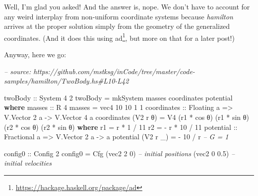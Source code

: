 \documentclass[]{article}
\newenvironment{Shaded}{}{}
\newcommand{\CommentTok}[1]{\textcolor[rgb]{0.38,0.63,0.69}{\textit{#1}}}
\newcommand{\DataTypeTok}[1]{\textcolor[rgb]{0.56,0.13,0.00}{#1}}
\newcommand{\DecValTok}[1]{\textcolor[rgb]{0.25,0.63,0.44}{#1}}
\newcommand{\FloatTok}[1]{\textcolor[rgb]{0.25,0.63,0.44}{#1}}
\newcommand{\FunctionTok}[1]{\textcolor[rgb]{0.02,0.16,0.49}{#1}}
\newcommand{\KeywordTok}[1]{\textcolor[rgb]{0.00,0.44,0.13}{\textbf{#1}}}
\newcommand{\NormalTok}[1]{#1}
\newcommand{\OtherTok}[1]{\textcolor[rgb]{0.00,0.44,0.13}{#1}}
\renewcommand{\href}[2]{#2\footnote{\url{#1}}}
\begin{document}
Well, I'm glad you asked! And the answer is, nope. We don't have to account for
any weird interplay from non-uniform coordinate systems because \emph{hamilton}
arrives at the proper solution simply from the geometry of the generalized
coordinates. (And it does this using
\href{https://hackage.haskell.org/package/ad}{ad}, but more on that for a later
post!)

Anyway, here we go:

\begin{Shaded}
\begin{Highlighting}[]
\CommentTok{-- source: https://github.com/mstksg/inCode/tree/master/code-samples/hamilton/TwoBody.hs#L10-L42}

\OtherTok{twoBody ::} \DataTypeTok{System} \DecValTok{4} \DecValTok{2}
\NormalTok{twoBody }\FunctionTok{=}\NormalTok{ mkSystem masses coordinates potential}
  \KeywordTok{where}
\OtherTok{    masses ::} \DataTypeTok{R} \DecValTok{4}
\NormalTok{    masses }\FunctionTok{=}\NormalTok{ vec4 }\DecValTok{10} \DecValTok{10} \DecValTok{1} \DecValTok{1}
\NormalTok{    coordinates}
\OtherTok{        ::} \DataTypeTok{Floating}\NormalTok{ a}
        \OtherTok{=>} \DataTypeTok{V.Vector} \DecValTok{2}\NormalTok{ a}
        \OtherTok{->} \DataTypeTok{V.Vector} \DecValTok{4}\NormalTok{ a}
\NormalTok{    coordinates (}\DataTypeTok{V2}\NormalTok{ r θ) }\FunctionTok{=} \DataTypeTok{V4}\NormalTok{ (r1 }\FunctionTok{*}\NormalTok{ cos θ) (r1 }\FunctionTok{*}\NormalTok{ sin θ)}
\NormalTok{                              (r2 }\FunctionTok{*}\NormalTok{ cos θ) (r2 }\FunctionTok{*}\NormalTok{ sin θ)}
      \KeywordTok{where}
\NormalTok{        r1 }\FunctionTok{=}\NormalTok{   r }\FunctionTok{*}  \DecValTok{1} \FunctionTok{/} \DecValTok{11}
\NormalTok{        r2 }\FunctionTok{=} \FunctionTok{-}\NormalTok{ r }\FunctionTok{*} \DecValTok{10} \FunctionTok{/} \DecValTok{11}
\NormalTok{    potential}
\OtherTok{        ::} \DataTypeTok{Fractional}\NormalTok{ a}
        \OtherTok{=>} \DataTypeTok{V.Vector} \DecValTok{2}\NormalTok{ a}
        \OtherTok{->}\NormalTok{ a}
\NormalTok{    potential (}\DataTypeTok{V2}\NormalTok{ r _) }\FunctionTok{=} \FunctionTok{-} \DecValTok{10} \FunctionTok{/}\NormalTok{ r       }\CommentTok{-- G = 1}

\OtherTok{config0 ::} \DataTypeTok{Config} \DecValTok{2}
\NormalTok{config0 }\FunctionTok{=} \DataTypeTok{Cfg}\NormalTok{ (vec2 }\DecValTok{2}   \DecValTok{0}\NormalTok{)  }\CommentTok{-- initial positions}
\NormalTok{              (vec2 }\DecValTok{0} \FloatTok{0.5}\NormalTok{)  }\CommentTok{-- initial velocities}
\end{Highlighting}
\end{Shaded}
\end{document}
